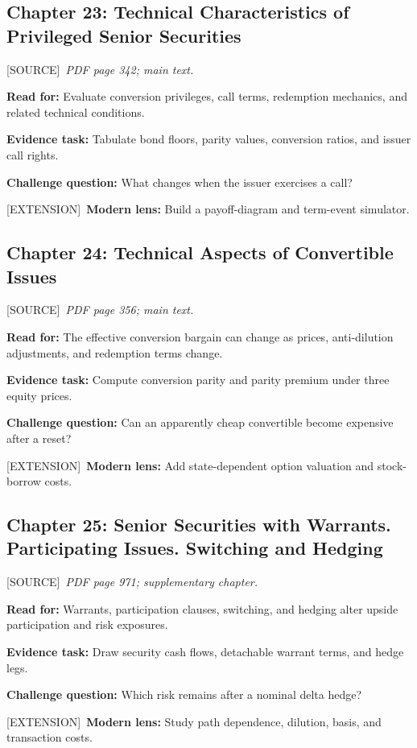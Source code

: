 \documentclass[11pt,letterpaper]{article}
\newcommand{\src}{\textsf{\color{sea}[SOURCE]}}
\newcommand{\ext}{\textsf{\color{gold}[EXTENSION]}}
\begin{document}
\subsection{Chapter 23: Technical Characteristics of Privileged Senior Securities}
\src\ \textit{PDF page 342; main text.}\par
\textbf{Read for:} Evaluate conversion privileges, call terms, redemption mechanics, and related technical conditions.\par
\textbf{Evidence task:} Tabulate bond floors, parity values, conversion ratios, and issuer call rights.\par
\textbf{Challenge question:} What changes when the issuer exercises a call?\par
\ext\ \textbf{Modern lens:} Build a payoff-diagram and term-event simulator.\par

\subsection{Chapter 24: Technical Aspects of Convertible Issues}
\src\ \textit{PDF page 356; main text.}\par
\textbf{Read for:} The effective conversion bargain can change as prices, anti-dilution adjustments, and redemption terms change.\par
\textbf{Evidence task:} Compute conversion parity and parity premium under three equity prices.\par
\textbf{Challenge question:} Can an apparently cheap convertible become expensive after a reset?\par
\ext\ \textbf{Modern lens:} Add state-dependent option valuation and stock-borrow costs.\par

\subsection{Chapter 25: Senior Securities with Warrants. Participating Issues. Switching and Hedging}
\src\ \textit{PDF page 971; supplementary chapter.}\par
\textbf{Read for:} Warrants, participation clauses, switching, and hedging alter upside participation and risk exposures.\par
\textbf{Evidence task:} Draw security cash flows, detachable warrant terms, and hedge legs.\par
\textbf{Challenge question:} Which risk remains after a nominal delta hedge?\par
\ext\ \textbf{Modern lens:} Study path dependence, dilution, basis, and transaction costs.\par
\end{document}
